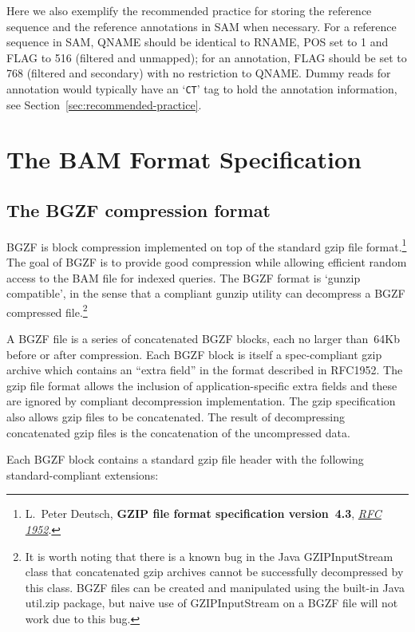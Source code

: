 \documentclass[10pt]{article}
\begin{document}
Here we also exemplify the recommended practice for storing the reference
sequence and the reference annotations in SAM when necessary. For a reference
sequence in SAM, {\sf QNAME} should be identical to {\sf RNAME}, {\sf POS} set
to 1 and {\sf FLAG} to 516 (filtered and unmapped); for an annotation, {\sf
FLAG} should be set to 768 (filtered and secondary) with no restriction to {\sf
QNAME}. Dummy reads for annotation would typically have an `{\tt CT}' tag to
hold the annotation information, see Section~\ref{sec:recommended-practice}.

\pagebreak

\section{The BAM Format Specification}

\subsection{The BGZF compression format}

BGZF is block compression implemented on top of the standard gzip file
format.\footnote{L.~Peter Deutsch, {\bf GZIP file format specification
version~4.3}, \href{http://tools.ietf.org/html/rfc1952}{\sl RFC 1952}.}
The goal of BGZF is to provide good compression while allowing
efficient random access to the BAM file for indexed queries. The BGZF
format is `gunzip compatible', in the sense that a compliant gunzip
utility can decompress a BGZF compressed file.\footnote{It is worth noting that there is a known bug in the Java {\sf
  GZIPInputStream} class that concatenated gzip archives cannot be
successfully decompressed by this class. BGZF files can be created and
manipulated using the built-in Java {\sf util.zip} package, but naive
use of {\sf GZIPInputStream} on a BGZF file will not work due to this
bug.}

A BGZF file is a series of concatenated BGZF blocks, each no larger
than~64Kb before or after compression. Each BGZF block
is itself a spec-compliant gzip archive which contains an ``extra field''
in the format described in RFC1952. The gzip file format allows the
inclusion of application-specific extra fields and these are ignored by
compliant decompression implementation. The gzip specification also
allows gzip files to be concatenated. The result of decompressing
concatenated gzip files is the concatenation of the uncompressed data.

Each BGZF block contains a standard gzip file header with the following
standard-compliant extensions:
\end{document}
